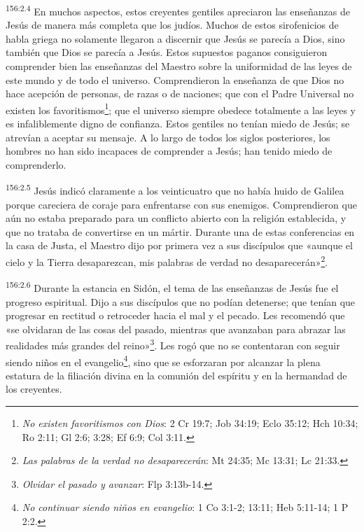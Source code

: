 \par 
\textsuperscript{156:2.4} En muchos aspectos, estos creyentes gentiles apreciaron las enseñanzas de Jesús de manera más completa que los judíos. Muchos de estos sirofenicios de habla griega no solamente llegaron a discernir que Jesús se parecía a Dios, sino también que Dios se parecía a Jesús. Estos supuestos paganos consiguieron comprender bien las enseñanzas del Maestro sobre la uniformidad de las leyes de este mundo y de todo el universo. Comprendieron la enseñanza de que Dios no hace acepción de personas, de razas o de naciones; que con el Padre Universal no existen los favoritismos\footnote{\textit{No existen favoritismos con Dios}: 2 Cr 19:7; Job 34:19; Eclo 35:12; Hch 10:34; Ro 2:11; Gl 2:6; 3:28; Ef 6:9; Col 3:11.}; que el universo siempre obedece totalmente a las leyes y es infaliblemente digno de confianza. Estos gentiles no tenían miedo de Jesús; se atrevían a aceptar su mensaje. A lo largo de todos los siglos posteriores, los hombres no han sido incapaces de comprender a Jesús; han tenido miedo de comprenderlo.

\par 
\textsuperscript{156:2.5} Jesús indicó claramente a los veinticuatro que no había huido de Galilea porque careciera de coraje para enfrentarse con sus enemigos. Comprendieron que aún no estaba preparado para un conflicto abierto con la religión establecida, y que no trataba de convertirse en un mártir. Durante una de estas conferencias en la casa de Justa, el Maestro dijo por primera vez a sus discípulos que «aunque el cielo y la Tierra desaparezcan, mis palabras de verdad no desaparecerán»\footnote{\textit{Las palabras de la verdad no desaparecerán}: Mt 24:35; Mc 13:31; Lc 21:33.}.

\par 
\textsuperscript{156:2.6} Durante la estancia en Sidón, el tema de las enseñanzas de Jesús fue el progreso espiritual. Dijo a sus discípulos que no podían detenerse; que tenían que progresar en rectitud o retroceder hacia el mal y el pecado. Les recomendó que «se olvidaran de las cosas del pasado, mientras que avanzaban para abrazar las realidades más grandes del reino»\footnote{\textit{Olvidar el pasado y avanzar}: Flp 3:13b-14.}. Les rogó que no se contentaran con seguir siendo niños en el evangelio\footnote{\textit{No continuar siendo niños en evangelio}: 1 Co 3:1-2; 13:11; Heb 5:11-14; 1 P 2:2.}, sino que se esforzaran por alcanzar la plena estatura de la filiación divina en la comunión del espíritu y en la hermandad de los creyentes.

